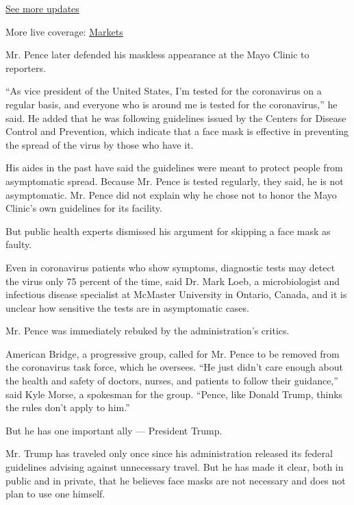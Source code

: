 \href{https://www.nytimes3xbfgragh.onion/2020/08/04/world/coronavirus-cases.html?action=click\&pgtype=Article\&state=default\&region=MAIN_CONTENT_1\&context=storylines_live_updates}{See
more updates}

More live coverage:
\href{https://www.nytimes3xbfgragh.onion/live/2020/08/04/business/stock-market-today-coronavirus?action=click\&pgtype=Article\&state=default\&region=MAIN_CONTENT_1\&context=storylines_live_updates}{Markets}

Mr. Pence later defended his maskless appearance at the Mayo Clinic to
reporters.

``As vice president of the United States, I'm tested for the coronavirus
on a regular basis, and everyone who is around me is tested for the
coronavirus,'' he said. He added that he was following guidelines issued
by the Centers for Disease Control and Prevention, which indicate that a
face mask is effective in preventing the spread of the virus by those
who have it.

His aides in the past have said the guidelines were meant to protect
people from asymptomatic spread. Because Mr. Pence is tested regularly,
they said, he is not asymptomatic. Mr. Pence did not explain why he
chose not to honor the Mayo Clinic's own guidelines for its facility.

But public health experts dismissed his argument for skipping a face
mask as faulty.

Even in coronavirus patients who show symptoms, diagnostic tests may
detect the virus only 75 percent of the time, said Dr. Mark Loeb, a
microbiologist and infectious disease specialist at McMaster University
in Ontario, Canada, and it is unclear how sensitive the tests are in
asymptomatic cases.

Mr. Pence was immediately rebuked by the administration's critics.

American Bridge, a progressive group, called for Mr. Pence to be removed
from the coronavirus task force, which he oversees. ``He just didn't
care enough about the health and safety of doctors, nurses, and patients
to follow their guidance,'' said Kyle Morse, a spokesman for the group.
``Pence, like Donald Trump, thinks the rules don't apply to him.''

But he has one important ally --- President Trump.

Mr. Trump has traveled only once since his administration released its
federal guidelines advising against unnecessary travel. But he has made
it clear, both in public and in private, that he believes face masks are
not necessary and does not plan to use one himself.

